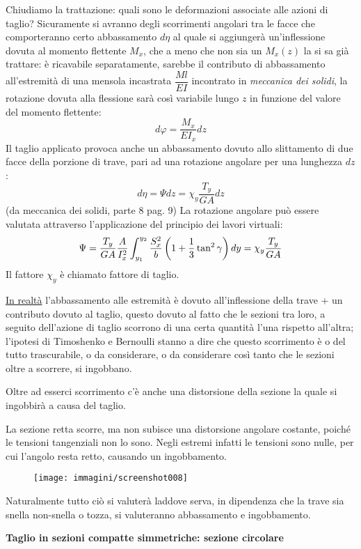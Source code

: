 \documentclass{article}
\begin{document}
\begin{adjustwidth}{2in}{}
		Chiudiamo la trattazione: quali sono le deformazioni associate alle azioni di taglio? Sicuramente si avranno degli scorrimenti angolari tra le facce che comporteranno certo abbassamento $d\eta$ al quale si aggiungerà un'inflessione dovuta al momento flettente $M_x$, che a meno che non sia un $M_x(z)$ la si sa già trattare: è ricavabile separatamente, sarebbe il contributo di abbassamento all'estremità di una mensola incastrata \(\dfrac{Ml}{EI}\) incontrato in \textit{meccanica dei solidi}, la rotazione dovuta alla flessione sarà così variabile lungo $ z $ in funzione del valore del momento flettente:
		\[ d\varphi = \dfrac{M_x}{EI_x}dz\]
		Il taglio applicato provoca anche un abbassamento dovuto allo slittamento di due facce della porzione di trave, pari ad una rotazione angolare per una lunghezza $dz$:
		\[d\eta = \Psi dz = \chi_y \dfrac{T_y}{GA}dz\]
		{\footnotesize (da meccanica dei solidi, parte 8 pag. 9)}\newline
		La rotazione angolare può essere valutata attraverso l'applicazione del principio dei lavori virtuali:
		\[ \Psi = \dfrac{T_y}{GA}\dfrac{A}{I_x^2}\int_{y_1}^{y_2}\dfrac{S_x^2}{b}\left(1 + {1\over 3}\tan^2\gamma\right)dy = \chi_y \dfrac{T_y}{GA} \] 
		Il fattore $\chi_y$ è chiamato fattore di taglio. \newline 
		
		\underline{In realtà} l'abbassamento alle estremità è dovuto all'inflessione della trave + un contributo dovuto al taglio, questo dovuto al fatto che le sezioni tra loro, a seguito dell'azione di taglio scorrono di una certa quantità l'una rispetto all'altra; l'ipotesi di Timoshenko e Bernoulli stanno a dire che questo scorrimento è o del tutto trascurabile, o da considerare, o da considerare così tanto che le sezioni oltre a scorrere, si ingobbano. \newline
		
		Oltre ad esserci scorrimento c'è anche una distorsione della sezione la quale si ingobbirà a causa del taglio.
		
		La sezione retta scorre, ma non subisce una distorsione angolare
		costante, poiché le tensioni tangenziali non lo sono. Negli estremi
		infatti le tensioni sono nulle, per cui l’angolo resta retto, causando
		un ingobbamento. 
		
\begin{figure}[H]
	\centering
	\texttt{[image: immagini/screenshot008]}
	\label{fig:screenshot008}
\end{figure}

		
		Naturalmente tutto ciò si valuterà laddove serva, in dipendenza che la trave sia snella non-snella o tozza, si valuteranno abbassamento e ingobbamento. 


\newpage

		\textbf{{\Large Taglio in sezioni compatte simmetriche: sezione circolare}} 
%
\end{adjustwidth}
\end{document}
